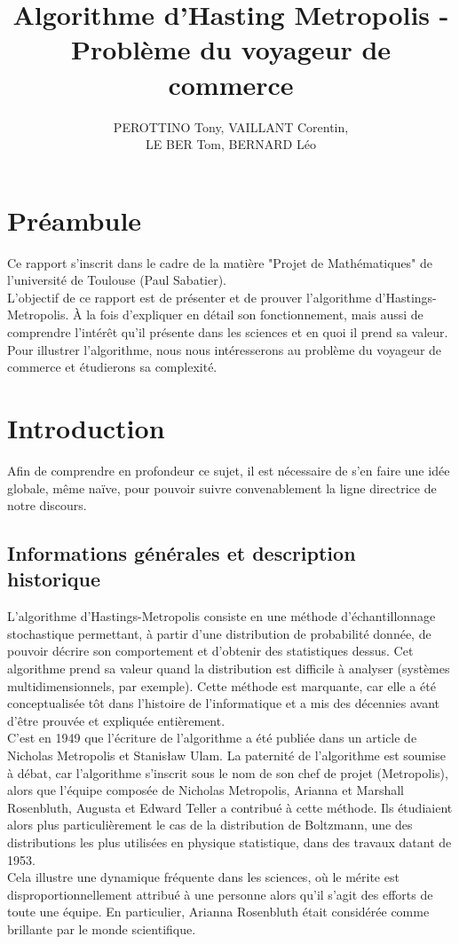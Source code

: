 \documentclass{article}
\title{Algorithme d'Hasting Metropolis - Problème du voyageur de commerce}
\author{PEROTTINO Tony, VAILLANT Corentin,\\ LE BER Tom, BERNARD Léo}
\begin{document}
\maketitle

\newpage
\tableofcontents
\newpage

\section*{Préambule}

Ce rapport s'inscrit dans le cadre de la matière "Projet de Mathématiques" de l'université de Toulouse (Paul Sabatier). \\
L'objectif de ce rapport est de présenter et de prouver l'algorithme d'Hastings-Metropolis. À la fois d'expliquer en détail son fonctionnement, mais aussi de comprendre l'intérêt qu'il présente dans les sciences et en quoi il prend sa valeur. \\
Pour illustrer l'algorithme, nous nous intéresserons au problème du voyageur de commerce et étudierons sa complexité.


\section{Introduction}

Afin de comprendre en profondeur ce sujet, il est nécessaire de s'en faire une idée globale, même naïve, pour pouvoir suivre convenablement la ligne directrice de notre discours.

\subsection{Informations générales et description historique}

L'algorithme d'Hastings-Metropolis consiste en une méthode d'échantillonnage stochastique permettant, à partir d'une distribution de probabilité donnée, de pouvoir décrire son comportement et d'obtenir des statistiques dessus. Cet algorithme prend sa valeur quand la distribution est difficile à analyser (systèmes multidimensionnels, par exemple). Cette méthode est marquante, car elle a été conceptualisée tôt dans l'histoire de l'informatique et a mis des décennies avant d'être prouvée et expliquée entièrement. \\
C'est en 1949 que l'écriture de l'algorithme a été publiée dans un article de Nicholas Metropolis et Stanisław Ulam. La paternité de l'algorithme est soumise à débat, car l'algorithme s'inscrit sous le nom de son chef de projet (Metropolis), alors que l'équipe composée de Nicholas Metropolis, Arianna et Marshall Rosenbluth, Augusta et Edward Teller a contribué à cette méthode. Ils étudiaient alors plus particulièrement le cas de la distribution de Boltzmann, une des distributions les plus utilisées en physique statistique, dans des travaux datant de 1953. \\
Cela illustre une dynamique fréquente dans les sciences, où le mérite est disproportionnellement attribué à une personne alors qu'il s'agit des efforts de toute une équipe. En particulier, Arianna Rosenbluth était considérée comme brillante par le monde scientifique. \\
\end{document}
